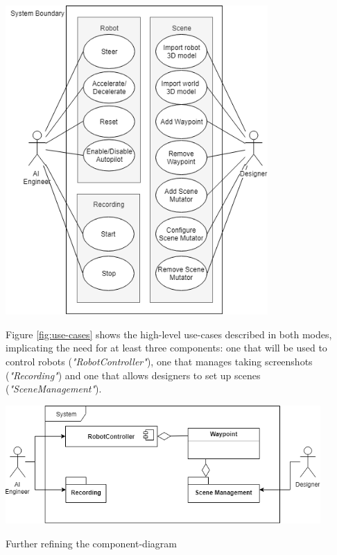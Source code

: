 \begin{center}
\noindent\includegraphics[width=10cm]{tex/img/ch04/Use_Cases_05.png}
\label{fig:use-cases}
\end{center}

Figure \ref{fig:use-cases} shows the high-level use-cases described in both modes, implicating the need for at least three components: one that will be used to control robots (\textit{"RobotController"}), one that manages taking screenshots (\textit{"Recording"}) and one that allows designers to set up scenes (\textit{"SceneManagement"}).

\begin{center}
\noindent\includegraphics[width=12cm]{tex/img/ch04/Component_Diagram01.png}
\label{fig:component-diagram-depth0}
\end{center}

Further refining the component-diagram 

